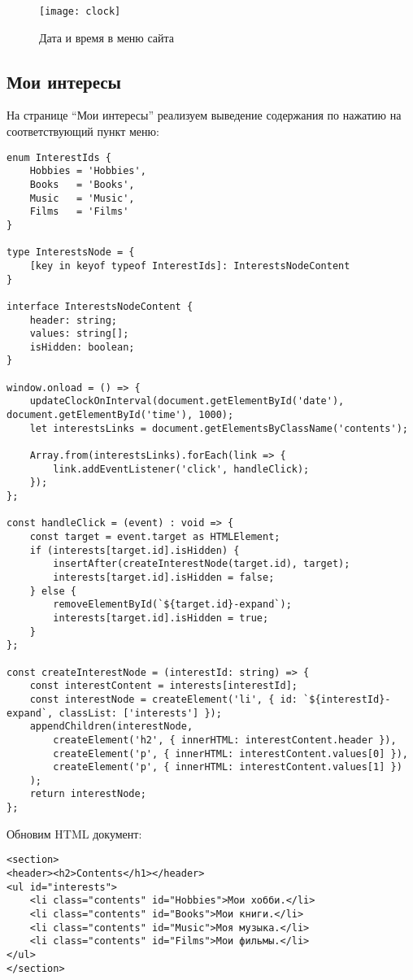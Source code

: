 \documentclass[a4paper,14pt]{extarticle}
\begin{document}
\begin{figure}[H]
    \centering
    \texttt{[image: clock]}
    \caption{Дата и время в меню сайта}
    \label{fig:clock}
\end{figure}

\subsection{Мои интересы}
На странице \enquote{Мои интересы} реализуем выведение содержания по нажатию на
соответствующий пункт меню:

\begin{lstlisting}
enum InterestIds {
    Hobbies = 'Hobbies', 
    Books   = 'Books', 
    Music   = 'Music', 
    Films   = 'Films'
}

type InterestsNode = {
    [key in keyof typeof InterestIds]: InterestsNodeContent
}

interface InterestsNodeContent {
    header: string;
    values: string[];
    isHidden: boolean;
}

window.onload = () => {
    updateClockOnInterval(document.getElementById('date'), document.getElementById('time'), 1000);
    let interestsLinks = document.getElementsByClassName('contents');

    Array.from(interestsLinks).forEach(link => {
        link.addEventListener('click', handleClick);
    });
};

const handleClick = (event) : void => {
    const target = event.target as HTMLElement;
    if (interests[target.id].isHidden) {
        insertAfter(createInterestNode(target.id), target);
        interests[target.id].isHidden = false;
    } else {
        removeElementById(`${target.id}-expand`);
        interests[target.id].isHidden = true;
    }
};

const createInterestNode = (interestId: string) => {
    const interestContent = interests[interestId];
    const interestNode = createElement('li', { id: `${interestId}-expand`, classList: ['interests'] });
    appendChildren(interestNode,
        createElement('h2', { innerHTML: interestContent.header }),
        createElement('p', { innerHTML: interestContent.values[0] }),
        createElement('p', { innerHTML: interestContent.values[1] })
    );
    return interestNode;
};
\end{lstlisting}

Обновим HTML документ:

\begin{lstlisting}
<section>
<header><h2>Contents</h1></header>
<ul id="interests">
    <li class="contents" id="Hobbies">Мои хобби.</li>
    <li class="contents" id="Books">Мои книги.</li>
    <li class="contents" id="Music">Моя музыка.</li>
    <li class="contents" id="Films">Мои фильмы.</li>
</ul>
</section>
\end{lstlisting}
\end{document}
